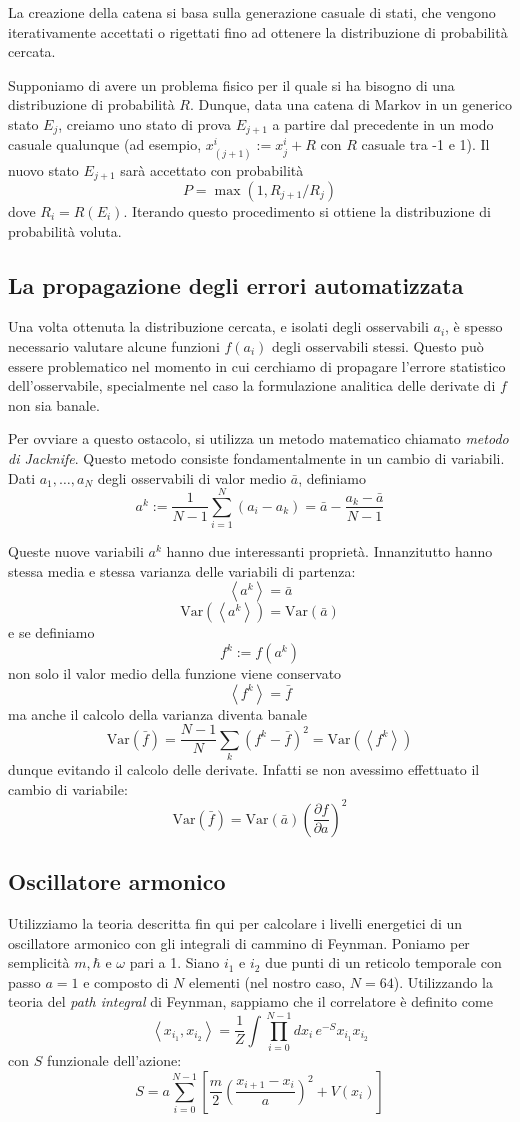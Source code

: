 \documentclass[a4paper,10pt]{article}
\begin{document}
La creazione della catena si basa sulla generazione casuale di stati, che vengono iterativamente accettati o rigettati fino ad ottenere la distribuzione di probabilità cercata.

Supponiamo di avere un problema fisico per il quale si ha bisogno di una distribuzione di probabilità $R$. Dunque, data una catena di Markov in un generico stato $E_j$, creiamo uno stato di prova $E_{j+1}$ a partire dal precedente in un modo casuale qualunque (ad esempio, $x^i_{(j+1)}:=x^i_j+R$ con $R$ casuale tra -1 e 1).
Il nuovo stato $E_{j+1}$ sarà accettato con probabilità $$P = \max(1, R_{j+1}/R_j)$$ dove $R_i = R(E_i)$. Iterando questo procedimento si ottiene la distribuzione di probabilità voluta.

\subsection{La propagazione degli errori automatizzata}
Una volta ottenuta la distribuzione cercata, e isolati degli osservabili $a_i$, è spesso necessario valutare alcune funzioni $f(a_i)$ degli osservabili stessi. Questo può essere problematico nel momento in cui cerchiamo di propagare l'errore statistico dell'osservabile, specialmente nel caso la formulazione analitica delle derivate di $f$ non sia banale.

Per ovviare a questo ostacolo, si utilizza un metodo matematico chiamato \emph{metodo di Jacknife}.
Questo metodo consiste fondamentalmente in un cambio di variabili. Dati $a_1,\dots,a_N$ degli osservabili di valor medio $\bar{a}$, definiamo
$$a^k := \frac{1}{N-1}\sum_{i=1}^N(a_i-a_k) = \bar{a}-\frac{a_k-\bar{a}}{N-1}$$

Queste nuove variabili $a^k$ hanno due interessanti proprietà. Innanzitutto hanno stessa media e stessa varianza delle variabili di partenza:
$$\left<a^k\right> = \bar{a} $$
$$\text{Var}(\left<a^k\right>) = \text{Var}(\bar{a}) $$
e se definiamo
$$f^k:=f(a^k)$$
non solo il valor medio della funzione viene conservato
$$\left<f^k\right> = \bar{f}$$
ma anche il calcolo della varianza diventa banale
$$\text{Var}(\bar{f}) = \frac{N-1}{N} \sum_k (f^k-\bar{f})^2 = \text{Var}(\left<f^k\right>)$$
dunque evitando il calcolo delle derivate. Infatti se non avessimo effettuato il cambio di variabile:
$$\text{Var}(\bar{f}) = \text{Var}(\bar{a})\left(\frac{\partial f}{\partial a}\right)^2 $$

\subsection{Oscillatore armonico}
Utilizziamo la teoria descritta fin qui per calcolare i livelli energetici di un oscillatore armonico con gli integrali di cammino di Feynman. Poniamo per semplicità $m, \hbar$ e $\omega$ pari a 1.
Siano $i_1$ e $i_2$ due punti di un reticolo temporale con passo $a=1$ e composto di $N$ elementi (nel nostro caso, $N=64$).
Utilizzando la teoria del \emph{path integral} di Feynman, sappiamo che il correlatore è definito come
$$ \left<x_{i_1},x_{i_2}\right> = \frac{1}{Z}\int\prod_{i=0}^{N-1}dx_i\,e^{-S}x_{i_1}x_{i_2} $$
con $S$ funzionale dell'azione:
$$ S = a\sum_{i=0}^{N-1} \left[ \frac{m}{2} \left( \frac{x_{i+1}-x_i}{a} \right)^2+V(x_i)\right]$$
\end{document}
